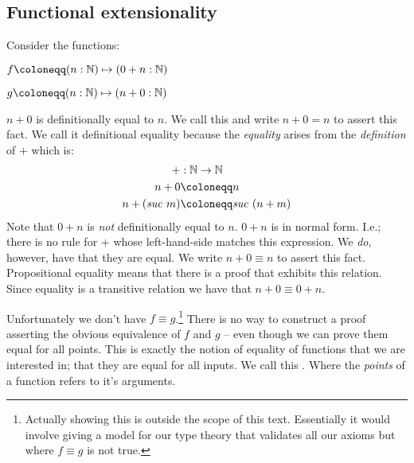 \documentclass{article}
\begin{document}
\subsection{Functional extensionality}
Consider the functions:
%
\begin{multicols}{2}
$f \defeq (n : \bN) \mapsto (0 + n : \bN)$

$g \defeq (n : \bN) \mapsto (n + 0 : \bN)$
\end{multicols}
%
$n + 0$ is definitionally equal to $n$. We call this  and write $n + 0 = n$ to assert this fact. We call it definitional
equality because the \emph{equality} arises from the \emph{definition} of $+$
which is:
%
\newcommand{\suc}[1]{\mathit{suc}\ #1}
\begin{align*}
  +           & : \bN \to \bN              \\
  n + 0       & \defeq n                   \\
  n + (\suc{m}) & \defeq \suc{(n + m)}
\end{align*}
%
Note that $0 + n$ is \emph{not} definitionally equal to $n$. $0 + n$ is in
normal form. I.e.; there is no rule for $+$ whose left-hand-side matches this
expression. We \emph{do}, however, have that they are 
equal. We write $n + 0 \equiv n$ to assert this fact. Propositional equality
means that there is a proof that exhibits this relation. Since equality is a
transitive relation we have that $n + 0 \equiv 0 + n$.

Unfortunately we don't have $f \equiv g$.\footnote{Actually showing this is
outside the scope of this text. Essentially it would involve giving a model
for our type theory that validates all our axioms but where $f \equiv g$ is
not true.} There is no way to construct a proof asserting the obvious
equivalence of $f$ and $g$ -- even though we can prove them equal for all
points. This is exactly the notion of equality of functions that we are
interested in; that they are equal for all inputs. We call this
. Where the \emph{points} of a function refers
to it's arguments.
%
\iffalse
I also want to talk about:
\begin{itemize}
\item
  Foundational systems
\item
  Theory vs. metatheory
\item
  Internal type theory
\end{itemize}
\fi
\end{document}
